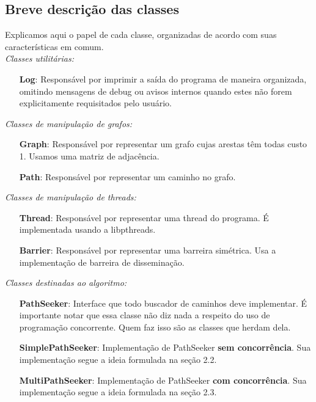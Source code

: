 \documentclass[a4paper,11pt]{article}
\begin{document}
  \subsection{Breve descrição das classes}
    Explicamos aqui o papel de cada classe, organizadas de acordo com suas
    características em comum. \\

    \textit{Classes utilitárias:}
    \begin{itemize}
      \item[\textbf{Log}:]
        Responsável por imprimir a saída do programa de maneira organizada,
        omitindo mensagens de debug ou avisos internos quando estes não forem
        explicitamente requisitados pelo usuário.
    \end{itemize}

    \textit{Classes de manipulação de grafos:}
    \begin{itemize}
      \item[\textbf{Graph}:]
        Responsável por representar um grafo cujas arestas têm todas custo 1.
        Usamos uma matriz de adjacência.
      \item[\textbf{Path}:]
        Responsável por representar um caminho no grafo.
    \end{itemize}

    \textit{Classes de manipulação de threads:}
    \begin{itemize}
      \item[\textbf{Thread}:]
        Responsável por representar uma thread do programa. É implementada
        usando a libpthreads.
      \item[\textbf{Barrier}:]
        Responsável por representar uma barreira simétrica. Usa a implementação
        de barreira de disseminação.
    \end{itemize}

    \textit{Classes destinadas ao algoritmo:}
    \begin{itemize}
      \item[\textbf{PathSeeker}:]
        Interface que todo buscador de caminhos deve implementar. É importante
        notar que essa classe não diz nada a respeito do uso de programação
        concorrente. Quem faz isso são as classes que herdam dela.
      \item[\textbf{SimplePathSeeker}:]
        Implementação de PathSeeker \textbf{sem concorrência}. Sua implementação
        segue a ideia formulada na seção 2.2.
      \item[\textbf{MultiPathSeeker}:]
        Implementação de PathSeeker \textbf{com concorrência}. Sua implementação
        segue a ideia formulada na seção 2.3.
    \end{itemize}
\end{document}
